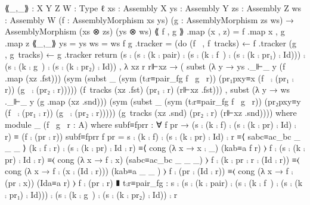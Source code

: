   ⟪_,_⟫ : {X Y Z W : Type ℓ}
          {xs : Assembly X}
          {ys : Assembly Y}
          {zs : Assembly Z}
          {ws : Assembly W}
          (f : AssemblyMorphism xs ys)
          (g : AssemblyMorphism zs ws)
          → AssemblyMorphism (xs ⊗ zs) (ys ⊗ ws)
  ⟪ f , g ⟫ .map (x , z) = f .map x , g .map z
  ⟪_,_⟫ {ys = ys} {ws = ws} f g .tracker = (do
                       (f~ , f~tracks) ← f .tracker
                       (g~ , g~tracks) ← g .tracker
                       return (s ⨾ (s ⨾ (k ⨾ pair) ⨾ (s ⨾ (k ⨾ f~) ⨾ (s ⨾ (k ⨾ pr₁) ⨾ Id))) ⨾ (s ⨾ (k ⨾ g~) ⨾ (s ⨾ (k ⨾ pr₂) ⨾ Id))
                              , λ xz r r⊩xz →
                                ( subst (λ y → ys ._⊩_ y (f .map (xz .fst)))
                                  (sym (subst _
                                              (sym (t⨾r≡pair_fg f~ g~ r))
                                              (pr₁pxy≡x (f~ ⨾ (pr₁ ⨾ r)) (g~ ⨾ (pr₂ ⨾ r)))))
                                  (f~tracks (xz .fst) (pr₁ ⨾ r) (r⊩xz .fst)))
                                , subst (λ y → ws ._⊩_ y (g .map (xz .snd)))
                                  (sym (subst _
                                              (sym (t⨾r≡pair_fg f~ g~ r))
                                              (pr₂pxy≡y (f~ ⨾ (pr₁ ⨾ r)) (g~ ⨾ (pr₂ ⨾ r)))))
                                  (g~tracks (xz .snd) (pr₂ ⨾ r) (r⊩xz .snd))))
                                where
                       module _ (f~ g~ r : A) where
                         subf≡fprr : ∀ f pr → (s ⨾ (k ⨾ f) ⨾ (s ⨾ (k ⨾ pr) ⨾ Id) ⨾ r) ≡ (f ⨾ (pr ⨾ r))
                         subf≡fprr f pr =
                                     s ⨾ (k ⨾ f) ⨾ (s ⨾ (k ⨾ pr) ⨾ Id) ⨾ r
                                       ≡⟨ sabc≡ac_bc _ _ _ ⟩
                                     (k ⨾ f ⨾ r) ⨾ (s ⨾ (k ⨾ pr) ⨾ Id ⨾ r)
                                       ≡⟨ cong (λ x → x ⨾ _) (kab≡a f r) ⟩
                                     f ⨾ (s ⨾ (k ⨾ pr) ⨾ Id ⨾ r)
                                       ≡⟨ cong (λ x → f ⨾ x) (sabc≡ac_bc _ _ _) ⟩
                                     f ⨾ (k ⨾ pr ⨾ r ⨾ (Id ⨾ r))
                                       ≡⟨ cong (λ x → f ⨾ (x ⨾ (Id ⨾ r))) (kab≡a _ _ ) ⟩
                                     f ⨾ (pr ⨾ (Id ⨾ r))
                                       ≡⟨ cong (λ x → f ⨾ (pr ⨾ x)) (Ida≡a r) ⟩
                                     f ⨾ (pr ⨾ r)
                                       ∎
                         t⨾r≡pair_fg :
                           s ⨾ (s ⨾ (k ⨾ pair) ⨾ (s ⨾ (k ⨾ f~) ⨾ (s ⨾ (k ⨾ pr₁) ⨾ Id))) ⨾ (s ⨾ (k ⨾ g~) ⨾ (s ⨾ (k ⨾ pr₂) ⨾ Id)) ⨾ r
